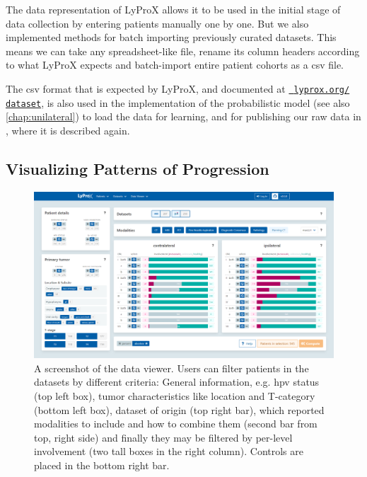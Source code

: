 \documentclass[\relativeRoot/main.tex]{subfiles}
\begin{document}
The data representation of LyProX allows it to be used in the initial stage of data collection by entering patients manually one by one. But we also implemented methods for batch importing previously curated datasets. This means we can take any spreadsheet-like file, rename its column headers according to what LyProX expects and batch-import entire patient cohorts as a \acrshort{csv} file.

The \acrshort{csv} format that is expected by LyProX, and documented at \href{https://lyprox.org/dataset}{~\texttt{lyprox.org/\\dataset}}, is also used in the implementation of the probabilistic  model (see also  \cref{chap:unilateral}) to load the data for learning, and for publishing our raw data in , where it is described again.

\subsection*{Visualizing Patterns of Progression}
\label{subsec:lyprox:implementation:viewer}

\begin{figure}
    \centering
    \includegraphics[width=1.0\textwidth, frame]{figures/data_viewer.png}
    \caption[
        Screenshot of the data viewer dashboard
    ]{
        A screenshot of the data viewer. Users can filter patients in the datasets by different criteria: General information, e.g. \gls{hpv} status (top left box), tumor characteristics like location and T-category (bottom left box), dataset of origin (top right bar), which reported modalities to include and how to combine them (second bar from top, right side) and finally they may be filtered by per-level involvement (two tall boxes in the right column). Controls are placed in the bottom right bar.
    }
    \label{fig:lyprox:data_viewer}
\end{figure}
\end{document}
